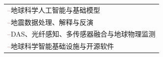 \begingroup
\small
\newcommand{\researchitem}[1]{\RaggedRight\textcolor{firebrick}{--}\enspace #1\par}
\renewcommand{\arraystretch}{1.28}
\begin{tabular}{@{}p{.96\linewidth}@{}}
  \researchitem{地球科学人工智能与基础模型} \\
  \researchitem{地震数据处理、解释与反演} \\
  \researchitem{DAS、光纤感知、多传感器融合与地球物理监测} \\
  \researchitem{地球科学智能基础设施与开源软件} \\
\end{tabular}
\endgroup

